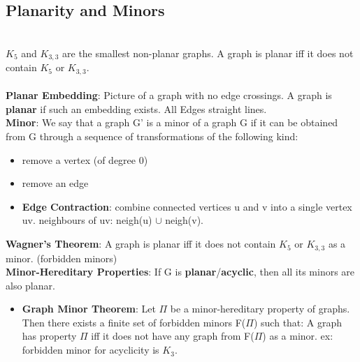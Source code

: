 \subsection*{Planarity and Minors}
\hspace{2pt}
 \\
$K_5$ and $K_{3,3}$ are the smallest non-planar graphs. A graph is planar iff it does not contain $K_5$ or $K_{3,3}$. \\ \columnbreak \\ 
\textbf{Planar Embedding}: Picture of a graph with no edge crossings. A graph is \textbf{planar} if such an embedding exists. All Edges straight lines. \\
\textbf{Minor}: We say that a graph G' is a minor of a graph G if it can be obtained from G through a sequence of transformations of the following kind: 
\begin{itemize}[noitemsep,topsep=0pt,leftmargin=*]
    \item remove a vertex (of degree 0)
    \item remove an edge 
    \item \textbf{Edge Contraction}: combine connected vertices u and v into a single vertex uv. neighbours of uv: neigh(u) $\cup$ neigh(v).\\
\end{itemize} 
\textbf{Wagner's Theorem}: A graph is planar iff it does not contain $K_5$ or $K_{3,3}$ as a minor. (forbidden minors) \\
\textbf{Minor-Hereditary Properties}: If G is \textbf{planar}/\textbf{acyclic}, then all its minors are also planar.
\begin{itemize}[noitemsep,topsep=0pt,leftmargin=*]
    \item \textbf{Graph Minor Theorem}: Let $\Pi$ be a minor-hereditary property of graphs. Then there exists a finite set of forbidden minors F($\Pi$) such that: A graph has property $\Pi$ iff it does not have any graph from F($\Pi$) as a minor. ex: forbidden minor for acyclicity is $K_3$. \\
\end{itemize} 
